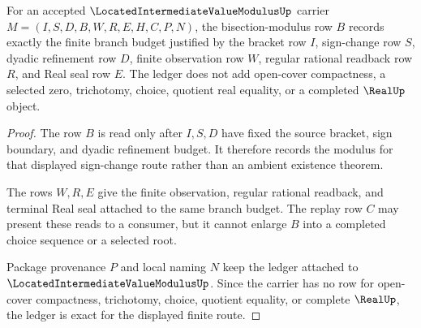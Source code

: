 \begin{theorem}\label{thm:located-intermediate-value-modulus-ledger-exactness}
For an accepted $\LocatedIntermediateValueModulusUp$ carrier $M=(I,S,D,B,W,R,E,H,C,P,N)$, the bisection-modulus row $B$ records exactly the finite branch budget justified by the bracket row $I$, sign-change row $S$, dyadic refinement row $D$, finite observation row $W$, regular rational readback row $R$, and Real seal row $E$. The ledger does not add open-cover compactness, a selected zero, trichotomy, choice, quotient real equality, or a completed $\RealUp$ object.
\end{theorem}
\begin{proof}
The row $B$ is read only after $I,S,D$ have fixed the source bracket, sign boundary, and dyadic refinement budget. It therefore records the modulus for that displayed sign-change route rather than an ambient existence theorem.

The rows $W,R,E$ give the finite observation, regular rational readback, and terminal Real seal attached to the same branch budget. The replay row $C$ may present these reads to a consumer, but it cannot enlarge $B$ into a completed choice sequence or a selected root.

Package provenance $P$ and local naming $N$ keep the ledger attached to $\LocatedIntermediateValueModulusUp$. Since the carrier has no row for open-cover compactness, trichotomy, choice, quotient equality, or complete $\RealUp$, the ledger is exact for the displayed finite route.
\end{proof}


\begin{closurestatus}{\LocatedIntermediateValueModulusUp}
  \theoryclosure{\seedClosure}
  \formalstatus{\unformalizedV}
\end{closurestatus}

